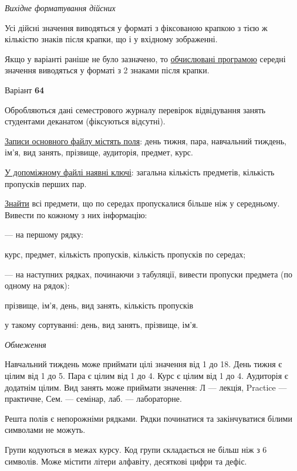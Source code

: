\documentclass[11pt, ukrainian]{article}
\begin{document}
\textit{Вихідне форматування дійсних}

Усі дійсні значення виводяться у форматі з фіксованою крапкою з тією ж кількістю знаків після крапки, що і у вхідному зображенні.

Якщо у варіанті раніше не було зазначено, то \underline{обчислювані програмою} середні значення виводяться у форматі з 2 знаками після крапки.




\par
\newpage
{\center Варіант  \No \textbf { 64 }\par}
\bigskip
Обробляються дані семестрового журналу перевірок відвідування занять студентами деканатом (фіксуються відсутні). 

\underline{Записи основного файлу містять поля}: день тижня, пара, навчальний тиждень, ім’я, вид занять, прізвище, аудиторія, предмет, курс.

\underline{У допоміжному файлі наявні ключі}: загальна кількість предметів, кількість пропусків перших пар.

\underline{Знайти} всі предмети, що по середах пропускалися більше ніж у середньому. Вивести по кожному з них інформацію:\par
{\noindent}--- на першому рядку:\par
курс, предмет, кількість пропусків, кількість пропусків по середах;

{\noindent}--- на наступних рядках, починаючи з табуляції, вивести пропуски предмета (по одному на рядок):\par
прізвище, ім’я, день, вид занять, кількість пропусків

{\noindent}у такому сортуванні: день, вид занять, прізвище, ім’я.


\bigskip\textit{Обмеження}

Навчальний тиждень може приймати цілі значення від 1 до 18.
День тижня є цілим від 1 до 5. Пара є цілим від 1 до 4.
Курс є цілим від 1 до 4. Аудиторія є додатнім цілим.
Вид занять може приймати значення:
Л --- лекція, Practice --- практичне, Сем. --- семінар, лаб. --- лабораторне.

Решта полів є непорожніми рядками.
Рядки починатися та закінчуватися білими символами не можуть.

Групи кодуються в межах курсу.
Код групи складається не більш ніж з 6 символів.
Може містити літери алфавіту, десяткові цифри та дефіс.
\end{document}
